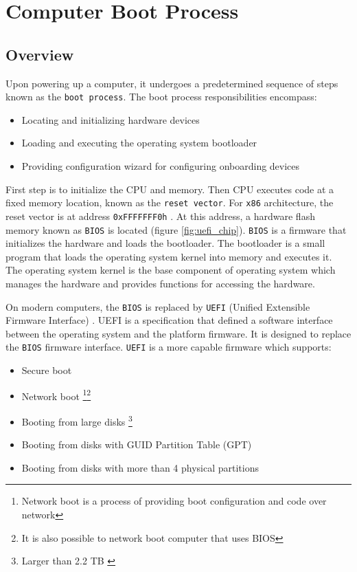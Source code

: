 \documentclass[../main.tex]{subfiles}
\begin{document}
\section{Computer Boot Process}
\label{sec:computer-boot-process}

\subsection{Overview}
Upon powering up a computer, it undergoes a predetermined sequence of steps known as the \texttt{boot process}.
The boot process responsibilities encompass:
\begin{itemize}
  \item Locating and initializing hardware devices
  \item Loading and executing the operating system bootloader
  \item Providing configuration wizard for configuring onboarding devices
\end{itemize}

First step is to initialize the CPU and memory. Then CPU executes
code at a fixed memory location, known as the \texttt{reset vector}.
For \texttt{x86} architecture, the reset vector is at address \texttt{0xFFFFFFF0h} \cite{resetvector}.
At this address, a hardware flash memory known as \texttt{BIOS} is located (figure \ref{fig:uefi_chip}). \texttt{BIOS} is a firmware
that initializes the hardware and loads the bootloader. The bootloader is a small program that
loads the operating system kernel into memory and executes it. The operating system kernel
is the base component of operating system which manages the hardware and provides functions for
accessing the hardware.

On modern computers, the \texttt{BIOS} is replaced by \texttt{UEFI} (Unified Extensible Firmware Interface) \cite{uefi_spec}.
UEFI is a specification that defined a software interface between the operating system and the platform firmware.
It is designed to replace the \texttt{BIOS} firmware interface. \texttt{UEFI} is a more capable firmware which supports:
\begin{itemize}
  \item Secure boot
  \item Network boot \footnote{Network boot is a process of providing boot configuration and code over network}\footnote{It is also possible to network boot computer that uses BIOS}
  \item Booting from large disks \footnote{Larger than 2.2 TB \cite{bios_limits}}
  \item Booting from disks with GUID Partition Table (GPT)
  \item Booting from disks with more than 4 physical partitions
\end{itemize}
\end{document}
